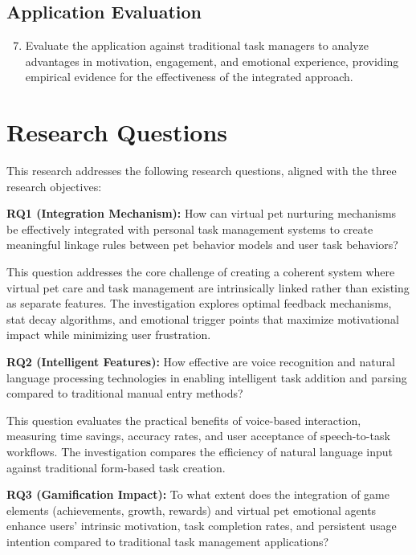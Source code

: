 \subsection{Application Evaluation}

\begin{enumerate}
    \setcounter{enumi}{6}
    \item Evaluate the application against traditional task managers to analyze advantages in motivation, engagement, and emotional experience, providing empirical evidence for the effectiveness of the integrated approach.
\end{enumerate}

\section{Research Questions}
\label{sec:research-questions}

This research addresses the following research questions, aligned with the three research objectives:

\textbf{RQ1 (Integration Mechanism):} How can virtual pet nurturing mechanisms be effectively integrated with personal task management systems to create meaningful linkage rules between pet behavior models and user task behaviors?

This question addresses the core challenge of creating a coherent system where virtual pet care and task management are intrinsically linked rather than existing as separate features. The investigation explores optimal feedback mechanisms, stat decay algorithms, and emotional trigger points that maximize motivational impact while minimizing user frustration.

\textbf{RQ2 (Intelligent Features):} How effective are voice recognition and natural language processing technologies in enabling intelligent task addition and parsing compared to traditional manual entry methods?

This question evaluates the practical benefits of voice-based interaction, measuring time savings, accuracy rates, and user acceptance of speech-to-task workflows. The investigation compares the efficiency of natural language input against traditional form-based task creation.

\textbf{RQ3 (Gamification Impact):} To what extent does the integration of game elements (achievements, growth, rewards) and virtual pet emotional agents enhance users' intrinsic motivation, task completion rates, and persistent usage intention compared to traditional task management applications?

